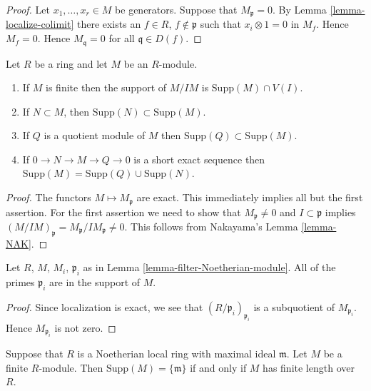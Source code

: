 \begin{proof}
Let $x_1,\ldots,x_r \in M$ be generators.
Suppose that $M_{\mathfrak p} = 0$.
By Lemma \ref{lemma-localize-colimit} there exists
an $f \in R$, $f\not\in \mathfrak p$ such that
$x_i\otimes 1 = 0$ in $M_f$. Hence $M_f = 0$.
Hence $M_{\mathfrak q} = 0$ for all $\mathfrak q\in D(f)$.
\end{proof}

\begin{lemma}
\label{lemma-support-quotient}
Let $R$ be a ring and let $M$ be an $R$-module.
\begin{enumerate}
\item If $M$ is finite then the support
of $M/IM$ is $\text{Supp}(M) \cap V(I)$.
\item If $N \subset M$, then $\text{Supp}(N) \subset
\text{Supp}(M)$.
\item If $Q$ is a quotient module of $M$ then $\text{Supp}(Q) \subset
\text{Supp}(M)$.
\item If $0 \to N \to M \to Q \to 0$ is a short exact sequence
then $\text{Supp}(M) = \text{Supp}(Q) \cup
\text{Supp}(N)$.
\end{enumerate}
\end{lemma}

\begin{proof}
The functors $M \mapsto M_{\mathfrak p}$ are exact. This immediately
implies all but the first assertion. For the first assertion
we need to show that $M_\mathfrak p \not = 0$ and
$I \subset \mathfrak p$ implies $(M/IM)_{\mathfrak p}
= M_\mathfrak p/IM_\mathfrak p \not = 0$. This follows
from Nakayama's Lemma \ref{lemma-NAK}.
\end{proof}

\begin{lemma}
\label{lemma-filter-primes-in-support}
Let $R$, $M$, $M_i$, $\mathfrak p_i$ as in
Lemma \ref{lemma-filter-Noetherian-module}.
All of the primes $\mathfrak p_i$ are in the support of
$M$.
\end{lemma}

\begin{proof}
Since localization is exact, we see that
$(R/\mathfrak p_i)_{\mathfrak p_i}$ is a
subquotient of $M_{\mathfrak p_i}$.
Hence $M_{\mathfrak p_i}$ is not zero.
\end{proof}

\begin{lemma}
\label{lemma-support-point}
Suppose that $R$ is a Noetherian local ring with
maximal ideal $\mathfrak m$. Let $M$ be a finite
$R$-module. Then $\text{Supp}(M) = \{ \mathfrak m\}$
if and only if $M$ has finite length over $R$.
\end{lemma}

